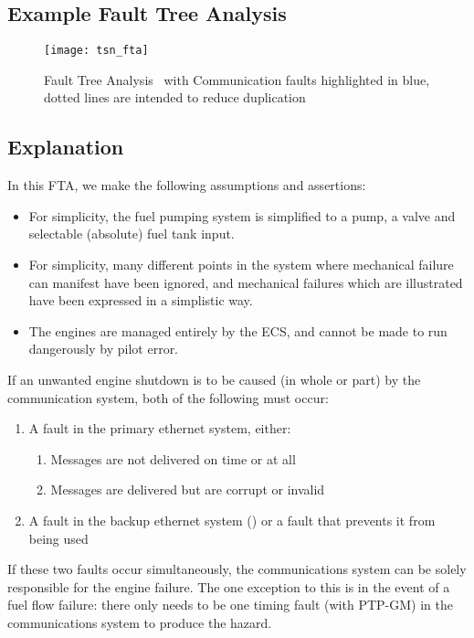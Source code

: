 \subsection{Example Fault Tree Analysis}


\begin{figure}[H]
\centering
\texttt{[image: tsn\_fta]}
\caption{Fault Tree Analysis~\cite{w.e.veselyFaultTreeHandbook1981} with Communication faults highlighted in blue, dotted lines are intended to reduce duplication}
\end{figure}

\subsection{Explanation}

In this FTA, we make the following assumptions and assertions:

\begin{itemize}
    \item For simplicity, the fuel pumping system is simplified to a pump, a valve and selectable (absolute) fuel tank input.
    \item For simplicity, many different points in the system where mechanical failure can manifest have been ignored, and mechanical failures which are illustrated have been expressed in a simplistic way.
    \item The engines are managed entirely by the ECS, and cannot be made to run dangerously by pilot error.
\end{itemize}

If an unwanted engine shutdown is to be caused (in whole or part) by the communication system, both of the following must occur:
\begin{enumerate}
    \item A fault in the primary ethernet system, either: \begin{enumerate}
        \item Messages are not delivered on time or at all
        \item Messages are delivered but are corrupt or invalid
    \end{enumerate}
    \item A fault in the backup ethernet system () or a fault that prevents it from being used
\end{enumerate}
If these two faults occur simultaneously, the communications system can be solely responsible for the engine failure.
The one exception to this is in the event of a fuel flow failure: there only needs to be one timing fault (with PTP-GM) in the communications system to produce the hazard.

